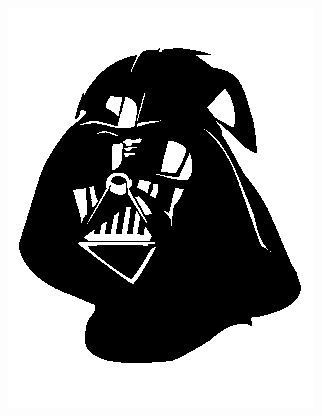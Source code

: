\documentclass[]{article}
\begin{document}
\begin{section}
\begin{subsection}
\begin{figure}
            \begin{subfigure}{0.4\textwidth}
                \centering
                \includegraphics[width=\textwidth]{darthvader.png}
                \caption{}
                \label{fig:darthvader}
            \end{subfigure}
            \begin{subfigure}{0.4\textwidth}
                \centering

\end{subfigure}
\end{figure}
\end{subsection}
\end{section}
\end{document}
